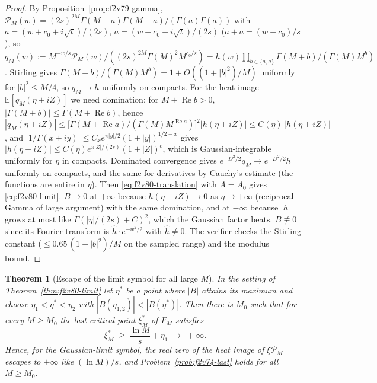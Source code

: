 \documentclass[11pt]{article}
\newtheorem{theorem}{Theorem}[section]
\theoremstyle{definition}
\theoremstyle{remark}
\begin{document}
\begin{proof}
By Proposition~\ref{prop:f2v79-gamma},
\(\mathcal P_M(w)=(2s)^{2M}\Gamma(M+a)\Gamma(M+\bar a)/(\Gamma(a)\Gamma(\bar a))\)
with \(a=(w+c_0+i\sqrt t)/(2s)\), \(\bar a=(w+c_0-i\sqrt t)/(2s)\)
(\(a+\bar a=(w+c_0)/s\)), so
\(q_M(w):=M^{-w/s}\mathcal P_M(w)/((2s)^{2M}\Gamma(M)^2M^{c_0/s})
=h(w)\prod_{b\in\{a,\bar a\}}\Gamma(M+b)/(\Gamma(M)M^{b})\).
Stirling gives \(\Gamma(M+b)/(\Gamma(M)M^b)=1+O((1+|b|^2)/M)\) uniformly
for \(|b|^2\le M/4\), so \(q_M\to h\) uniformly on compacts.  For the
heat image \(\mathbb E[q_M(\eta+iZ)]\) we need domination: for
\(M+\operatorname{Re}b>0\), \(|\Gamma(M+b)|\le\Gamma(M+\operatorname{Re}b)\),
hence \(|q_M(\eta+iZ)|\le\bigl[\Gamma(M+\operatorname{Re}a)/(\Gamma(M)M^{\operatorname{Re}a})\bigr]^2|h(\eta+iZ)|
\le C(\eta)\,|h(\eta+iZ)|\), and \(|1/\Gamma(x+iy)|\le C_xe^{\pi|y|/2}(1+|y|)^{1/2-x}\)
gives \(|h(\eta+iZ)|\le C(\eta)e^{\pi|Z|/(2s)}(1+|Z|)^{c}\), which is
Gaussian-integrable uniformly for \(\eta\) in compacts.  Dominated
convergence gives \(e^{-D^2/2}q_M\to e^{-D^2/2}h\) uniformly on compacts,
and the same for derivatives by Cauchy's estimate (the functions are
entire in \(\eta\)).  Then \eqref{eq:f2v80-translation} with
\(A=A_0\) gives \eqref{eq:f2v80-limit}.  \(B\to0\) at \(+\infty\)
because \(h(\eta+iZ)\to0\) as \(\eta\to+\infty\) (reciprocal Gamma of
large argument) with the same domination, and at \(-\infty\) because
\(|h|\) grows at most like \(\Gamma(|\eta|/(2s)+C)^2\), which the Gaussian
factor beats.  \(B\not\equiv0\) since its Fourier transform is
\(\widehat h\cdot e^{-w^2/2}\) with \(\widehat h\ne0\).  The verifier
checks the Stirling constant (\(\le0.65\,(1+|b|^2)/M\) on the sampled
range) and the modulus bound.
\end{proof}

\begin{theorem}[Escape of the limit symbol for all large \(M\)]
\label{thm:f2v80-escape}
In the setting of Theorem~\ref{thm:f2v80-limit} let \(\eta^*\) be a point
where \(|B|\) attains its maximum and choose \(\eta_1<\eta^*<\eta_2\)
with \(|B(\eta_{1,2})|<|B(\eta^*)|\).  Then there is \(M_0\) such that for
every \(M\ge M_0\) the last critical point \(\xi^*_M\) of \(F_M\) satisfies
\begin{equation}
 \boxed{\;\xi^*_M\;\ge\;\frac{\ln M}{s}+\eta_1\;\longrightarrow\;+\infty .}
 \label{eq:f2v80-escape}
\end{equation}
Hence, for the Gaussian-limit symbol, the real zero of the
heat image of \(\xi\mathcal P_M\) escapes to \(+\infty\) like
\((\ln M)/s\), and Problem~\ref{prob:f2v74-last} holds for all \(M\ge M_0\).
\end{theorem}
\end{document}
